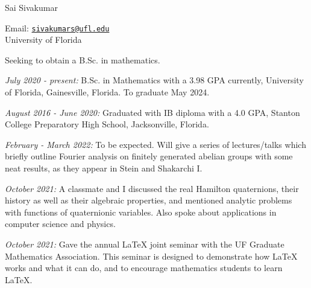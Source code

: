 \documentclass[11pt]{article}
\begin{document}
{\huge Sai Sivakumar}

Email: \href{mailto:sivakumars@ufl.edu}{\texttt{sivakumars@ufl.edu}}\\%
University of Florida


\noindent{}

Seeking to obtain a B.Sc. in mathematics.%

\noindent{}

\textsl{July 2020 - present:} B.Sc. in Mathematics with a 3.98 GPA currently, University of Florida, Gainesville, Florida. To graduate May 2024.

\textsl{August 2016 - June 2020:} Graduated with IB diploma with a 4.0 GPA, Stanton College Preparatory High School, Jacksonville, Florida.



\noindent{}

\textsl{February - March 2022:} To be expected. Will give a series of lectures/talks which briefly outline Fourier analysis on finitely generated abelian groups with some neat results, as they appear in Stein and Shakarchi I.

\textsl{October 2021:} A classmate and I discussed the real Hamilton quaternions, their history as well as their algebraic properties, and mentioned analytic problems with functions of quaternionic variables. Also spoke about applications in computer science and physics.

\textsl{October 2021:} Gave the annual \LaTeX\hspace{1pt} joint seminar with the UF Graduate Mathematics Association. This seminar is designed to demonstrate how \LaTeX\hspace{1pt} works and what it can do, and to encourage mathematics students to learn \LaTeX\hspace{1pt}.
\end{document}
